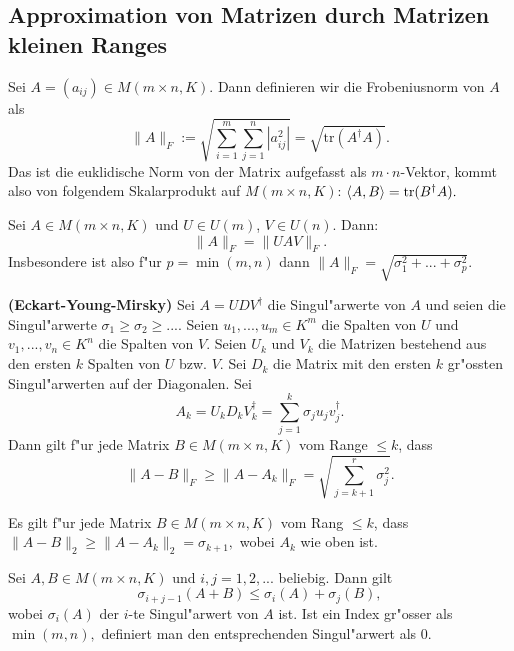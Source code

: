 \documentclass[9pt, a4paper, twocolumn, landscape]{article}
\begin{document}
{%

\subsection{Approximation von Matrizen durch Matrizen kleinen Ranges}
\begin{definition}
Sei $A = (a_{ij}) \in M( m \times n, K)$. Dann definieren wir die Frobeniusnorm von $A$ als
$$
\|A\|_F := \sqrt{\sum\limits_{i = 1}^m \sum\limits_{j = 1}^n |a_{ij}^2|} = \sqrt{\mathrm{tr}(A^\dagger A)}.
$$
Das ist die euklidische Norm von der Matrix aufgefasst als $m \cdot n$-Vektor, kommt also von folgendem Skalarprodukt auf $M(m \times n, K)$:
$
\left\langle {A} , {B} \right\rangle = \mathrm{tr}(B^\dagger A).
$
\end{definition}



\begin{lemma}
Sei $A \in M( m \times n, K)$ und $U \in U(m)$, $V \in U(n)$. Dann:
$$
\| A \|_F = \|UAV\|_F.
$$
Insbesondere ist also f"ur $p = \min(m, n)$ dann
$
\|A\|_F =  \sqrt{\sigma_1^2 + ... + \sigma_p^2}.
$
\end{lemma}

\begin{theorem} \textbf{(Eckart-Young-Mirsky)} Sei $A = UDV^\dagger$ die Singul"arwerte von $A$ und seien die Singul"arwerte $\sigma_1 \geq  \sigma_2 \geq...$. Seien $u_1, ..., u_m \in K^m$ die Spalten von $U$ und $v_1, ..., v_n \in K^n$ die Spalten von $V$. Seien $U_k$ und $V_k$ die Matrizen bestehend aus den ersten $k$ Spalten von $U$ bzw. $V$. Sei $D_k$ die Matrix mit den ersten $k$ gr"ossten Singul"arwerten auf der Diagonalen. Sei 
$$
A_k = U_k D_k V_k^\dagger = \sum\limits_{j = 1}^k \sigma_j u_j v_j^\dagger.
$$
Dann gilt f"ur jede Matrix $B \in M( m \times n, K)$ vom Range $\leq k$, dass
$$
\|A - B\|_F \geq \|A - A_k \|_F = \sqrt{\sum\limits_{j = k+1}^r \sigma_j^2}.
$$
\end{theorem}

\begin{remark}
Es gilt f"ur jede Matrix $B \in M( m \times n, K)$ vom Rang $\leq k$, dass \\
$
\|A - B\|_2 \geq \|A - A_k \|_2 = \sigma_{k+1},
$
wobei $A_k$ wie oben ist.
\end{remark}

\begin{corollary}
Sei $A, B \in M(m \times n, K)$ und $i, j = 1, 2, ...$ beliebig. Dann gilt
$$
\sigma_{i+j-1} (A+B) \leq \sigma_i(A) + \sigma_j(B), 
$$
wobei $ \sigma_i(A)$ der $i$-te Singul"arwert von $A$ ist. Ist ein Index gr"osser als $\min(m, n),$ definiert man den entsprechenden Singul"arwert als $0$.
\end{corollary}

}
\end{document}
